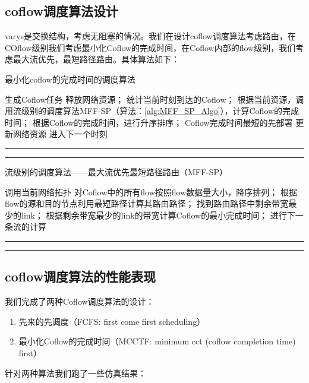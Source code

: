 \documentclass[a4paper, 11pt]{article}                                                   %
\begin{document}
\begin{CJK*}{UTF8}{song}
\subsection{coflow调度算法设计}
varys是交换结构，考虑无阻塞的情况。我们在设计coflow调度算法考虑路由，在COflow级别我们考虑最小化Coflow的完成时间，在Coflow内部的flow级别，我们考虑最大流优先，最短路径路由。具体算法如下：

\begin{algorithm}[H]
    \caption{最小化coflow的完成时间的调度算法}
    \label{alg:min_cct_Algo} %
    \begin{algorithmic}[1]  %
    \STATE 生成Coflow任务
            \STATE 释放网络资源；
        \ENDIF
        \STATE 统计当前时刻到达的Coflow；
            \STATE 根据当前资源，调用流级别的调度算法MFF-SP（算法：\ref{alg:MFF_SP_Algo}），计算Coflow的完成时间；
            \STATE 根据Coflow的完成时间，进行升序排序；
            \STATE Coflow完成时间最短的先部署
            \STATE 更新网络资源
        \ELSE
            \STATE 进入下一个时刻
        \ENDIF
    \ENDFOR
    \end{algorithmic}
\end{algorithm}
\noindent\hrule
\vspace{0.1em}\noindent\hrule

\bigskip

\begin{algorithm}[H]
    \caption{流级别的调度算法——最大流优先最短路径路由（MFF-SP）}
    \label{alg:MFF_SP_Algo} %
    \begin{algorithmic}[1]  %
    \STATE 调用当前网络拓扑
    \STATE 对Coflow中的所有flow按照flow数据量大小，降序排列；
            \STATE 根据flow的源和目的节点利用最短路径计算其路由路径；
            \STATE 找到路由路径中剩余带宽最少的link；
            \STATE 根据剩余带宽最少的link的带宽计算Coflow的最小完成时间；
        \ELSE
            \STATE 进行下一条流的计算
        \ENDIF
    \ENDFOR
    \end{algorithmic}
\end{algorithm}
\noindent\hrule
\vspace{0em}\noindent\hrule
\subsection{coflow调度算法的性能表现}
我们完成了两种Coflow调度算法的设计：
\begin{enumerate}
  \item 先来的先调度（FCFS: first come first scheduling）
  \item 最小化Coflow的完成时间（MCCTF: minimum cct (coflow completion time) first）
\end{enumerate}
针对两种算法我们跑了一些仿真结果：


\end{CJK*}
\end{document}
